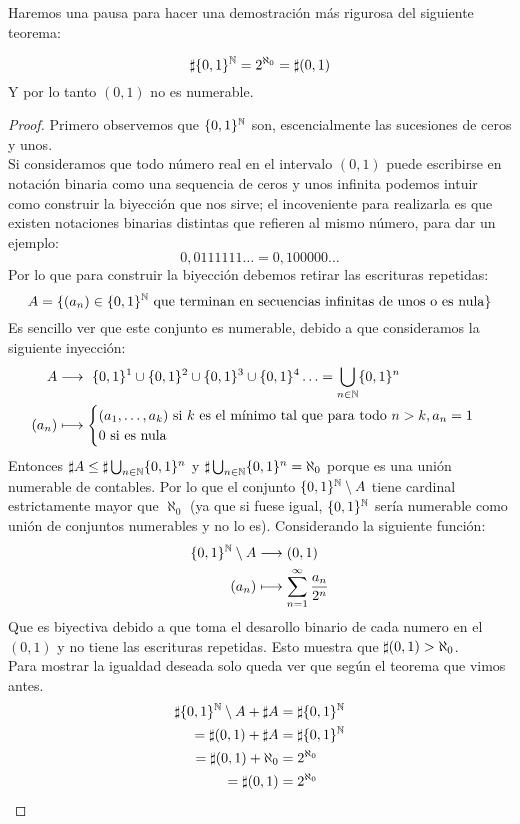\documentclass[12pt,a4paper]{book}
\begin{document}
Haremos una pausa para hacer una demostración más rigurosa del siguiente teorema:
\begin{teo}[Cantor]
$$ \sharp \{0,1\}^{\mathbb{N}} = 2^{\aleph_0} = \sharp (0,1)$$
Y por lo tanto $(0,1)$ no es numerable.
\begin{proof}
Primero observemos que $\{0,1\}^{\mathbb{N}}$ son, escencialmente las sucesiones de ceros y unos.\\
Si consideramos que todo número real en el intervalo $(0,1)$ puede escribirse en notación binaria como una sequencia de ceros y unos infinita podemos intuir como construir la biyección que nos sirve; el incoveniente para realizarla es que existen notaciones binarias distintas que refieren al mismo número, para dar un ejemplo:
$$ 0,0111111 \ldots = 0,100000 \ldots$$
Por lo que para construir la biyección debemos retirar las escrituras repetidas:
$$ A = \{ (a_n) \in \{0,1\}^{\mathbb{N}}\mbox{ que terminan en secuencias infinitas de unos o es nula}\} $$
Es sencillo ver que este conjunto es numerable, debido a que consideramos la siguiente inyección:
\begin{align*}
 A &\longrightarrow\ \{0,1\}^1 \cup \{0,1\}^2 \cup \{0,1\}^3 \cup \{0,1\}^4 \ldots = \bigcup_{n \in \mathbb{N}}\{0,1\}^n\\
 (a_n) &\longmapsto \begin{cases} (a_1, \ldots, a_k)  \mbox{ si $k$ es el mínimo tal que para todo } n > k,  a_n = 1 \\ 0 \mbox{ si es nula} \end{cases}
\end{align*}
Entonces $\sharp A \leq \sharp \bigcup_{n \in \mathbb{N}} \{0,1\}^n$ y $\sharp \bigcup_{n \in \N} \{0,1\}^n = \a0$ porque es una unión numerable de contables. Por lo que el conjunto $\{0,1\}^{\mathbb{N}} \setminus A$ tiene cardinal estrictamente mayor que $\aleph_0$ (ya que si fuese igual, $\{0,1\}^{\mathbb{N}}$ sería numerable como unión de conjuntos numerables y no lo es). Considerando la siguiente función:
\begin{align*}
\{0,1\}^{\mathbb{N}} \setminus A &\longrightarrow (0,1) \\
(a_n) &\longmapsto \sum_{n=1}^{\infty} \frac{a_n}{2^n}
\end{align*}
Que es biyectiva debido a que toma el desarollo binario de cada numero en el $(0,1)$ y no tiene las escrituras repetidas. Esto muestra que $\sharp (0,1) > \a0$.\\
Para mostrar la igualdad deseada solo queda ver que según el teorema que vimos antes.
\begin{align*}
\sharp \{0,1\}^{\mathbb{N}} \setminus A  + \sharp A &= \sharp \{0,1\}^{\mathbb{N}} \\
= \sharp (0,1) + \sharp A &= \sharp \{0,1\}^{\mathbb{N}} \\
= \sharp (0,1) + \aleph_0 &= 2^{\aleph_0} \\
= \sharp (0,1) &= 2^{\aleph_0}
\end{align*}
\end{proof}
\end{teo}
\end{document}
